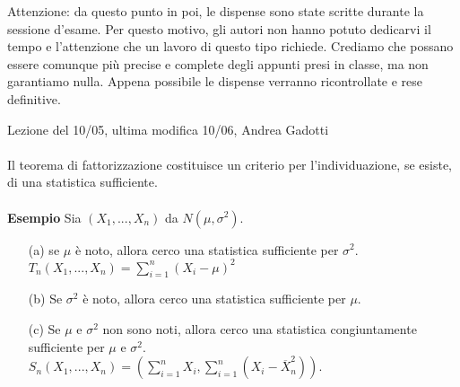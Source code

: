 \newpage

\vspace*{\fill}
\noindent \large Attenzione: da questo punto in poi, le dispense sono state scritte durante la sessione d'esame. Per questo motivo, gli autori non hanno potuto dedicarvi il tempo e l'attenzione che un lavoro di questo tipo richiede. Crediamo che possano essere comunque più precise e complete degli appunti presi in classe, ma non garantiamo nulla. Appena possibile le dispense verranno ricontrollate e rese definitive.
\vspace*{\fill}
\newpage



Lezione del 10/05, ultima modifica 10/06, Andrea Gadotti\\
\\
Il teorema di fattorizzazione costituisce un criterio per l'individuazione, se esiste, di una statistica sufficiente.
\\
\\
\textbf{Esempio} Sia $(X_1,...,X_n)$ da $N(\mu,\sigma^2)$.
\begin{enumerate}
\item [(a)] se $\mu$ è noto, allora cerco una statistica sufficiente per $\sigma^2$.\\
$T_n (X_1,...,X_n) = \displaystyle\sum_{i=1}^n (X_i-\mu)^2$
\item [(b)] Se $\sigma^2$ è noto, allora cerco una statistica sufficiente per $\mu$.
\item [(c)] Se $\mu$ e $\sigma^2$ non sono noti, allora cerco una statistica congiuntamente sufficiente per $\mu$ e $\sigma^2$.\\
$S_n (X_1,...,X_n) = \left( \sum_{i=1}^n X_i, \sum_{i=1}^n (X_i - \overline{X}_n^2) \right)$.
\end{enumerate}

